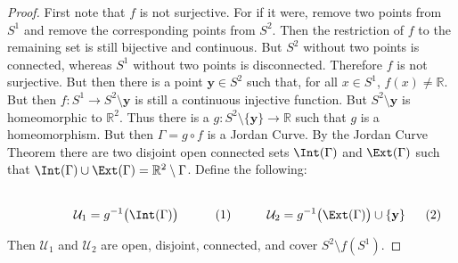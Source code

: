 \documentclass[crop=false,class=book,oneside]{standalone}
\begin{document}
            \begin{proof}
                First note that $f$ is not surjective. For if it were,
                remove two points from $S^{1}$ and remove the corresponding
                points from $S^{2}$. Then the restriction of $f$ to the
                remaining set is still bijective and continuous. But
                $S^{2}$ without two points is connected, whereas $S^{1}$
                without two points is disconnected. Therefore $f$ is not
                surjective. But then there is a point $\mathbf{y}\in{S}^{2}$
                such that, for all $x\in{S}^{1}$, $f(x)\ne\mathbb{R}$.
                But then $f:S^{1}\rightarrow{S}^{2}\setminus\mathbf{y}$
                is still a continuous injective function. But
                $S^{2}\setminus\mathbf{y}$ is homeomorphic to $\mathbb{R}^{2}$.
                Thus there is a
                $g:S^{2}\setminus\{\mathbf{y}\}\rightarrow\mathbb{R}$
                such that $g$ is a homeomorphism. But then $\Gamma=g\circ{f}$
                is a Jordan Curve. By the Jordan Curve Theorem there are two disjoint
                open connected sets $\Int(\Gamma)$ and $\Ext(\Gamma)$ such that
                $\Int(\Gamma)\cup\Ext(\Gamma)=\mathbb{R}^{2}\setminus\Gamma$.
                Define the following:
                \par
                \begin{subequations}
                    \begin{minipage}[b]{0.49\textwidth}
                        \centering
                        \begin{equation}
                            \mathcal{U}_{1}=g^{-1}\big(\Int(\Gamma)\big)
                        \end{equation}
                    \end{minipage}
                    \hfill
                    \begin{minipage}[b]{0.49\textwidth}
                        \begin{equation}
                            \mathcal{U}_{2}
                            =g^{-1}\big(\Ext(\Gamma)\big)\cup\{\mathbf{y}\}
                        \end{equation}
                    \end{minipage}
                \end{subequations}
                \par\hfill\par
                Then $\mathcal{U}_{1}$ and $\mathcal{U}_{2}$ are open, disjoint,
                connected, and cover $S^{2}\setminus{f}(S^{1})$.
            \end{proof}
\end{document}
